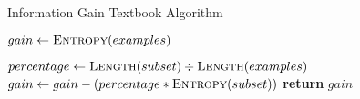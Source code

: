\begin{algorithm}[H]
\caption{Information Gain Textbook Algorithm}\label{a:c45-gain-simple}
\begin{algorithmic}[1]
    \State $gain \gets \textsc{Entropy}(examples)$

        \State $percentage \gets \textsc{Length}(subset) \div \textsc{Length}(examples)$
            \State $gain \gets gain - (percentage * \textsc{Entropy}(subset))$
        \EndIf
    \EndFor
    \State \textbf{return} $gain$
\EndProcedure
\end{algorithmic}
\end{algorithm}
